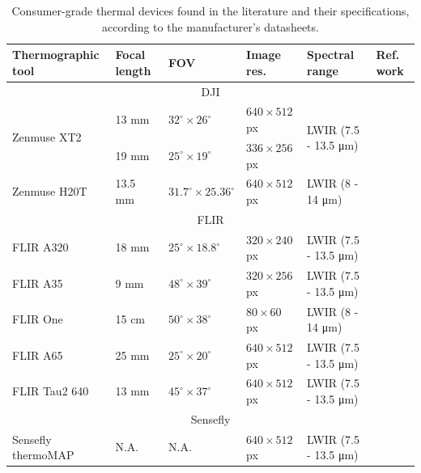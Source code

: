 \renewcommand{\arraystretch}{1.2}
\begin{table}[htb]
    \small
    \caption{Consumer-grade thermal devices found in the literature and their specifications, according to the manufacturer's datasheets.}
    \label{table:thermographic_devices}
    \begin{tabular}{llllll}
        \toprule
        Thermographic tool & Focal length & FOV & Image res. & Spectral range & Ref. work \\
        \midrule
        \multicolumn{6}{c}{DJI}\\
        \multirow{2}{*}{Zenmuse XT2}    & 13 \si{\milli\meter}   & $32^{\circ} \times 26^{\circ}$  & $640 \times 512$ px  & \multirow{2}{*}{LWIR (7.5 - 13.5 \si{\micro\meter})}    & \multirow{2}{*}{\cite{lopez_optimized_2021, yuan_uav-based_2021, jo_dense_2021}}\\
        & 19 \si{\milli\meter}   & $25^{\circ} \times 19^{\circ}$  & $336 \times 256$ px  &   & \\
        Zenmuse H20T     & 13.5 \si{\milli\meter}   & $31.7^{\circ} \times 25.36^{\circ}$  & $640 \times 512$ px  & LWIR (8 - 14 \si{\micro\meter})    & \cite{paziewska_integration_2022, jiang_diurnal_2022}\\
        \cmidrule{1-6}
        \multicolumn{6}{c}{FLIR}\\
        FLIR A320     & 18 \si{\milli\meter}   & $25^{\circ} \times 18.8^{\circ}$  & $320 \times 240$ px  & LWIR (7.5 - 13.5 \si{\micro\meter})    & \cite{guilbert_fusion_2020}\\
        FLIR A35     & 9 \si{\milli\meter}   & $48^{\circ} \times 39^{\circ}$  & $320 \times 256$ px  & LWIR (7.5 - 13.5 \si{\micro\meter})    & \cite{comba_2d_2019}\\
        FLIR One     & 15 \si{\centi\meter}   & $50^{\circ} \times 38^{\circ}$  & $80 \times 60$ px  & LWIR (8 - 14 \si{\micro\meter})    & \cite{javadnejad_photogrammetric_2020}\\
        FLIR A65     & 25 \si{\milli\meter}   & $25^{\circ} \times 20^{\circ}$  & $640 \times 512$ px  & LWIR (7.5 - 13.5 \si{\micro\meter})    & \cite{adan_fusion_2017, jarzabek-rychard_supervised_2020, lin_fusion_2019, westfeld_generation_2015}\\
        FLIR Tau2 640     & 13 \si{\milli\meter}   & $45^{\circ} \times 37^{\circ}$  & $640 \times 512$ px  & LWIR (7.5 - 13.5 \si{\micro\meter})    & \cite{boesch_thermal_2017, sledz_thermal_2018}\\
        \cmidrule{1-6}
        \multicolumn{6}{c}{Sensefly}\\
        Sensefly thermoMAP     & N.A.   & N.A.  & $640 \times 512$ px  & LWIR (7.5 - 13.5 \si{\micro\meter})    & \cite{padua_vineyard_2019}\\
        \bottomrule
    \end{tabular}
\end{table}
\renewcommand{\arraystretch}{1}

